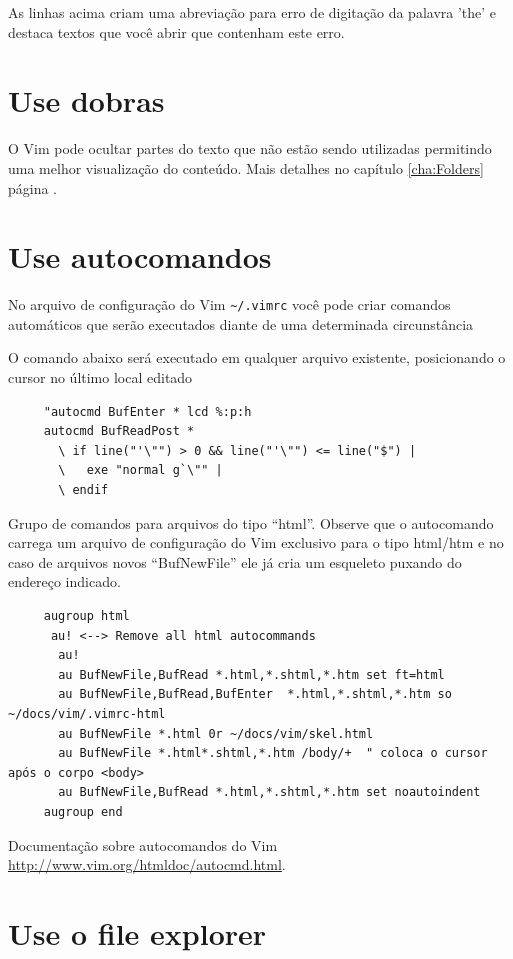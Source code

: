\documentclass[10pt,a4paper,openany]{book}
\begin{document}
As linhas acima criam uma abreviação para erro de digitação da palavra 'the'
e destaca textos que você abrir que contenham este erro.

\section{Use dobras}\label{sec:Use folders}

O Vim pode ocultar partes do texto que não estão sendo utilizadas permitindo
uma melhor visualização do conteúdo. Mais detalhes no capítulo
\ref{cha:Folders} página \pageref{cha:Folders}.

\section{Use autocomandos}
\label{Use autocomandos}

No arquivo de configuração do Vim \verb|~/.vimrc| você pode criar comandos
automáticos que serão executados diante de uma determinada
circunstância

O comando abaixo será executado em qualquer arquivo existente, posicionando o cursor no último local editado

\begin{verbatim}
     "autocmd BufEnter * lcd %:p:h
     autocmd BufReadPost *
       \ if line("'\"") > 0 && line("'\"") <= line("$") |
       \   exe "normal g`\"" |
       \ endif
\end{verbatim}


Grupo de comandos para arquivos do tipo ``html''. Observe que o
autocomando carrega um arquivo de configuração do Vim exclusivo para o
tipo html/htm e no caso de arquivos novos ``BufNewFile'' ele já cria um
esqueleto puxando do endereço indicado.

\begin{verbatim}
     augroup html
      au! <--> Remove all html autocommands
       au!
       au BufNewFile,BufRead *.html,*.shtml,*.htm set ft=html
       au BufNewFile,BufRead,BufEnter  *.html,*.shtml,*.htm so ~/docs/vim/.vimrc-html
       au BufNewFile *.html 0r ~/docs/vim/skel.html
       au BufNewFile *.html*.shtml,*.htm /body/+  " coloca o cursor após o corpo <body>
       au BufNewFile,BufRead *.html,*.shtml,*.htm set noautoindent
     augroup end
\end{verbatim}

Documentação sobre autocomandos do Vim \url{http://www.vim.org/htmldoc/autocmd.html}.

\section{Use o file explorer}\label{Use o file explorer}
\end{document}
